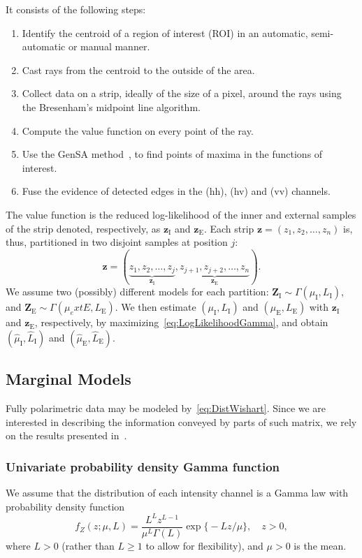 \documentclass[journal]{IEEEtran}
\begin{document}
It consists of the following steps:
\begin{enumerate}
	\item Identify the centroid of a region of interest (ROI) in an automatic, semi-automatic or manual manner.
	\item Cast rays from the centroid to the outside of the area.
	\item Collect data on a strip, ideally of the size of a pixel, around the rays using the  Bresenham's midpoint line algorithm.
	\item Compute the value function on every point of the ray.
	\item Use the GenSA method~\cite{xgsh}, to find points of maxima in the functions of interest.
	\item Fuse the evidence of detected edges in the (hh), (hv) and (vv) channels.
\end{enumerate}

The value function is the reduced log-likelihood of the inner and external samples of the strip denoted, respectively, as $\bm z_\text{I}$ and $\bm z_\text{E}$.
Each strip $\bm z = (z_1,z_2,\dots,z_n)$ is, thus, partitioned in two disjoint samples at position $j$:
$$
\bm z = (\underbrace{z_1,z_2,\dots,z_j}_{\bm z_\text{I}}, 
\underbrace{z_{j+1}, z_{j+2},\dots,z_n}_{\bm z_\text{E}}).
$$
We assume two (possibly) different models for each partition:
$\bm Z_\text{I} \sim \Gamma(\mu_\text{I},L_\text{I})$, and 
$\bm Z_\text{E} \sim \Gamma(\mu_ext{E},L_\text{E})$.
We then estimate $(\mu_\text{I},L_\text{I})$ and $(\mu_\text{E},L_\text{E})$ with $\bm z_\text{I}$ and $\bm z_\text{E}$, respectively, by maximizing~\eqref{eq:LogLikelihoodGamma}, and obtain $(\widehat{\mu}_\text{I}, \widehat{L}_\text{I})$ and $(\widehat{\mu}_\text{E}, \widehat{L}_\text{E})$.

\subsection{Marginal Models}
Fully polarimetric data may be modeled by~\eqref{eq:DistWishart}.
Since we are interested in describing the information conveyed by parts of such matrix, we rely on the results presented in~\cite{lee,hsbmp}.

\subsubsection{Univariate probability density Gamma function}
We assume that the distribution of each intensity channel is a 
Gamma law with probability density function
\begin{equation}
f_Z(z;\mu,L)=\frac{L^{L}z^{L-1}}{\mu^{L}\Gamma(L)} \exp\big\{-Lz/\mu\big\},\quad z>0,
\label{func_dens_uni_gamma}
\end{equation}
where $L>0$ (rather than $L\geq1$ to allow for flexibility), and
$\mu>0$ is the mean.
\end{document}
